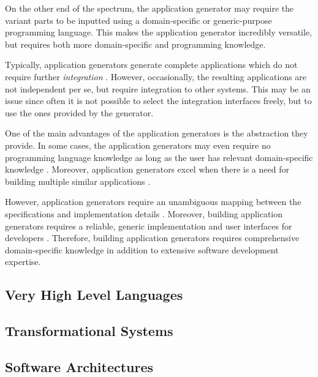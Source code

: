 On the other end of the spectrum, the application generator may require the variant parts to be inputted using a domain-specific or generic-purpose programming language. This makes the application generator incredibly versatile, but requires both more domain-specific and programming knowledge.

Typically, application generators generate complete applications which do not require further \emph{integration} \citep[chap.~7]{krueger_software_1992}. However, occasionally, the resulting applications are not independent per se, but require integration to other systems. This may be an issue since often it is not possible to select the integration interfaces freely, but to use the ones provided by the generator.

One of the main advantages of the application generators is the abstraction they provide. In some cases, the application generators may even require no programming language knowledge as long as the user has relevant domain-specific knowledge \citep{horowitz_survey_1985}. Moreover, application generators excel when there is a need for building multiple similar applications \citep[chap.~7]{krueger_software_1992}. 

However, application generators require an unambiguous mapping between the specifications and implementation details \citep[chap.~7]{krueger_software_1992}. Moreover, building application generators requires a reliable, generic implementation and user interfaces for developers \citep{cleaveland_building_1988}. Therefore, building application generators requires comprehensive domain-specific knowledge in addition to extensive software development expertise.

\subsection{Very High Level Languages}


\subsection{Transformational Systems}


\subsection{Software Architectures}

